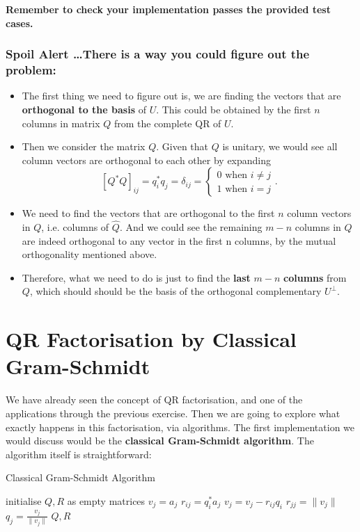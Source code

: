 \noindent \textbf{Remember to check your implementation passes the provided test cases.}
\newpage

\subsubsection*{Spoil Alert \ldots There is a way you could figure out the problem:}%
\begin{itemize}
\item The first thing we need to figure out is, we are finding the vectors that are \textbf{orthogonal to the basis} of \(U\). This could be obtained by the first \(n\) columns in matrix \(Q\) from the complete QR of \(U\).
\item Then we consider the matrix \(Q\). Given that $Q$ is unitary, we would see all column vectors are orthogonal to each other by expanding
  \[
    [Q^*Q]_{ij} = q_i^*q_j = \delta_{ij} = \left\{
      \begin{array}{l}
      0 \text{ when $i \neq j$} \\
      1 \text{ when $i = j$}
      \end{array}
    \right.
  .\] 
  \item We need to find the vectors that are orthogonal to the first \(n\)  column vectors in $Q$, i.e. columns of \(\hat{Q}\). And we could see the remaining $m - n$ columns in  $Q$ are indeed orthogonal to any vector in the first n columns, by the mutual orthogonality mentioned above. 
  \item Therefore, what we need to do is just to find the \textbf{last} $m - n$ \textbf{columns} from $Q$, which should should be the basis of the orthogonal complementary $U^{\bot}$. \checked
\end{itemize}

\newpage
\section{QR Factorisation by Classical Gram-Schmidt}%
We have already seen the concept of QR factorisation, and one of the applications through the previous exercise. Then we are going to explore what exactly happens in this factorisation, via algorithms. The first implementation we would discuss would be the \textbf{classical Gram-Schmidt algorithm}. The algorithm itself is straightforward:
\begin{algorithm}
  \caption{Classical Gram-Schmidt Algorithm}
  \begin{algorithmic}[1]
    \State initialise \(Q, R\)  as empty matrices
      \State \(v_j = a_j\)
        \State \(r_{ij} = q_i^{*}a_j\)
        \State \(v_j = v_j - r_{ij}q_i\)
      \EndFor
      \State \(r_{jj} = \|v_j\|\)  
      \State \(q_j = \frac{v_j}{\|v_j\|}\)
    \EndFor
    \State \Return \(Q, R\)
  \EndProcedure
  \end{algorithmic}
\end{algorithm}

